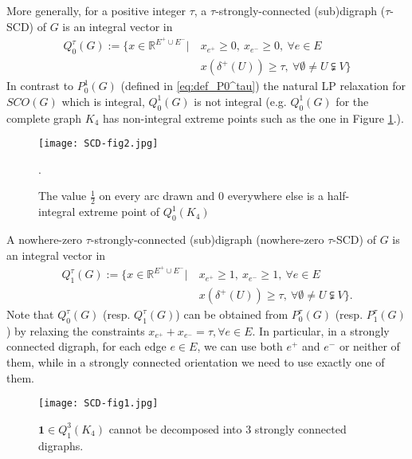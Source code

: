 \documentclass[runningheads]{llncs}
\begin{document}
More generally, for a positive integer $\tau$, a $\tau$-strongly-connected (sub)digraph ($\tau$-SCD) of $G$ is an integral vector in
    \begin{equation}
    \begin{aligned}
        Q_0^\tau(G):=\big\{x\in\mathbb{R}^{E^+\cup E^-}\big|~&x_{e^+}\geq 0,~ x_{e^-}\geq 0, ~\forall e\in E\\
        &x(\delta^+(U))\geq \tau,~ \forall \emptyset \neq U\subsetneqq V\big\}
    \end{aligned}
    \end{equation}
In contrast to $P_0^1(G)$ (defined in \eqref{eq:def_P0^tau}) the natural LP relaxation for $SCO(G)$ which is integral, $Q_0^1(G)$ is not integral (e.g. $Q_0^1(G)$ for the complete graph $K_4$ has non-integral extreme points such as the one in Figure \ref{fig:scd_half_integral}.).
\begin{figure}[htbp]
	\centering
	\texttt{[image: SCD-fig2.jpg]}
 \caption{The value $\frac{1}{2}$ on every arc drawn and $0$ everywhere else is a half-integral extreme point of $Q_0^1(K_4)$}.
 \label{fig:scd_half_integral}
\end{figure}


    
    A nowhere-zero $\tau$-strongly-connected (sub)digraph (nowhere-zero $\tau$-SCD) of $G$ is an integral vector in
    \begin{equation}\label{eq:def_Q_1^k}
    \begin{aligned}
        Q_1^\tau(G):=\big\{x\in\mathbb{R}^{E^+\cup E^-}\big|~&x_{e^+}\geq 1,~ x_{e^-}\geq 1, ~\forall e\in E\\
        &x(\delta^+(U))\geq \tau,~ \forall \emptyset \neq U\subsetneqq V\big\}.
    \end{aligned}
    \end{equation}
Note that $Q_0^\tau(G)$ (resp. $Q_1^\tau(G)$) can be obtained from $P_0^\tau(G)$ (resp. $P_1^\tau(G)$) by relaxing the constraints $x_{e^+}+x_{e^-}=\tau, \forall e\in E$. In particular, in a strongly connected digraph, for each edge $e\in E$, we can use both $e^+$ and $e^-$ or neither of them, while in a strongly connected orientation we need to use exactly one of them. 




\begin{figure}[htbp]
	\centering
	\texttt{[image: SCD-fig1.jpg]}
 \caption{$\mathbf{1}\in Q_1^3(K_4)$ cannot be decomposed into $3$ strongly connected digraphs.}
 \label{fig:scd}
\end{figure}
\end{document}
